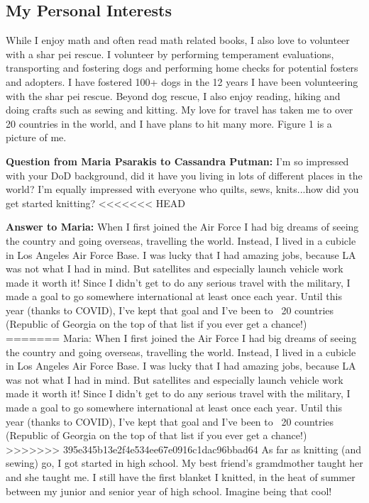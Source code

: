 \subsection{My Personal Interests}
While I enjoy math and often read math related books, I also love to volunteer with a shar pei rescue.  I volunteer by performing temperament evaluations, transporting and fostering dogs and  performing home checks for potential fosters and adopters.  I have fostered 100+ dogs in the 12 years I have been volunteering with the shar pei rescue.  Beyond dog rescue, I also enjoy reading, hiking and doing crafts such as sewing and kitting. My love for travel has taken me to over 20 countries in the world, and I have plans to hit many more.  Figure 1 is a picture of me.

\textbf{Question from Maria Psarakis to Cassandra Putman:} I'm so impressed with your DoD background, did it have you living in lots of different places in the world? I'm equally impressed with everyone who quilts, sews, knits...how did you get started knitting? 
<<<<<<< HEAD

\textbf{Answer to Maria:} When I first joined the Air Force I had big dreams of seeing the country and going overseas, travelling the world.  Instead, I lived in a cubicle in Los Angeles Air Force Base. I was lucky that I had amazing jobs, because LA was not what I had in mind.  But satellites and especially launch vehicle work made it worth it!  Since I didn't get to do any serious travel with the military, I made a goal to go somewhere international at least once each year.  Until this year (thanks to COVID), I've kept that goal and I've been to ~20 countries (Republic of Georgia on the top of that list if you ever get a chance!) 
=======
Maria: When I first joined the Air Force I had big dreams of seeing the country and going overseas, travelling the world.  Instead, I lived in a cubicle in Los Angeles Air Force Base. I was lucky that I had amazing jobs, because LA was not what I had in mind.  But satellites and especially launch vehicle work made it worth it!  Since I didn't get to do any serious travel with the military, I made a goal to go somewhere international at least once each year.  Until this year (thanks to COVID), I've kept that goal and I've been to ~20 countries (Republic of Georgia on the top of that list if you ever get a chance!) 
>>>>>>> 395e345b13e2f4e534ee67e0916c1dac96bbad64
As far as knitting (and sewing) go, I got started in high school. My best friend's gramdmother taught her and she taught me. I still have the first blanket I knitted, in the heat of summer between my junior and senior year of high school. Imagine being that cool! 
